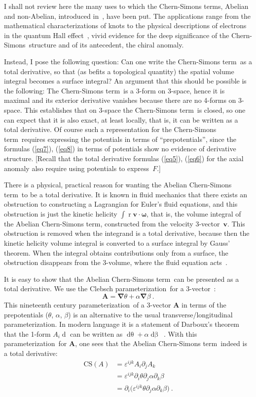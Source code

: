\documentclass[a4paper,12pt,twoside]{article}
\newcommand{\rd}[1]{\mathop{\mathrm{d}#1}}
\newcommand{\grad}{\vec\nabla}
\newcommand{\nA}{non-Abelian}
\newcommand{\CS}{Chern-Simons}
\newcommand{\CSt}{Chern-Simons term}
\newcommand{\Cpr}{Clebsch pa\-ra\-me\-ter\-iza\-tion}
\newcommand{\pr}{para\-me\-ter\-iza\-tion}
\newcommand{\pp}[1]{\partial_{#1}}
\newcommand{\numeq}[2]{\begin{equation}
#2
\label{#1}
\end{equation}}
\newcommand{\refeq}[1]{(\ref{#1})}
\let\vec\boldsymbol
\let\eps\varepsilon
\begin{document}
I shall not review here the many uses to which the \CSt s, Abelian and \nA,
introduced in~\cite{ref7}, have been put. The applications range from the
mathematical characterizations of knots to the physical descriptions of electrons in
the quantum Hall effect~\cite{ref9}, vivid evidence for the deep significance of the
\CS\ structure and of its antecedent, the chiral anomaly. 

Instead, I pose the following question: Can one write the \CSt\ as a total derivative,
so that (as befits a topological quantity) the spatial volume integral becomes a surface
integral? 
 An argument that this should be possible is the
following: The
\CSt\ is a 3-form on 3-space, hence it is maximal and its exterior derivative vanishes
because there are no 4-forms on 3-space. This establishes that on 3-space  the \CSt\
is closed, so one can expect that it is also exact, at least locally, that is, it can be
written as a total derivative. 
Of course such a representation for the \CSt\ requires expressing the potentials  in
terms of ``prepotentials'', since the formulas \refeq{eq7}, \refeq{eq8} in terms of
potentials show no evidence of derivative structure. 
[Recall that the total derivative formulas \refeq{eq5}, \refeq{eq6} for the axial
anomaly also require using potentials to express~$F$.]

There is a physical, practical reason for wanting the Abelian \CSt\  to be a total
derivative. It is known in fluid mechanics that there exists an obstruction to
constructing a Lagrangian for Euler's fluid equations, and this obstruction is just the
kinetic helicity  \hbox{$\int \rd{^3 r} \vec v\cdot \vec\omega$}, that is, the volume
integral of the Abelian \CSt, constructed from the velocity 3-vector~$\vec v$. This
obstruction is removed when the integrand is a total derivative, because then the
kinetic helicity volume integral is converted to a surface integral by Gauss' theorem.
When the integral obtains contributions only from a surface,  the obstruction
disappears from the 3-volume, where the fluid equation acts~\cite{ref10}. 

It is easy to show that the  Abelian \CSt\ can be presented as a total derivative. We
use the \Cpr\ for  a 3-vector~\cite{ref11}:
\numeq{eq10}{
\vec A = \grad\theta + \alpha\grad\beta\ .
}
This nineteenth century \pr\ of a 3-vector $\vec A$ in terms of the prepotentials
($\theta$, $\alpha$, $\beta$) is an alternative to the usual transverse/longitudinal
\pr. In modern language it is a statement of Darboux's
theorem that the 1-form $A_i \rd{r^i}$ can be written as $\rd \theta + \alpha
\rd\beta$~\cite{ref12}. With this
\pr\ for $\vec A$, one sees that the Abelian \CSt\ indeed is  a total derivative:
\begin{align}
\mathrm{CS}(A) &= \eps^{ijk} A_i \pp j A_k\label{eq11}\\
&=  \eps^{ijk} \pp i \theta\pp j \alpha \pp k \beta\nonumber\\
&= \pp i \bigl( \eps^{ijk} \theta\pp j \alpha \pp k \beta\bigr)\ .\nonumber
\end{align}
\end{document}
